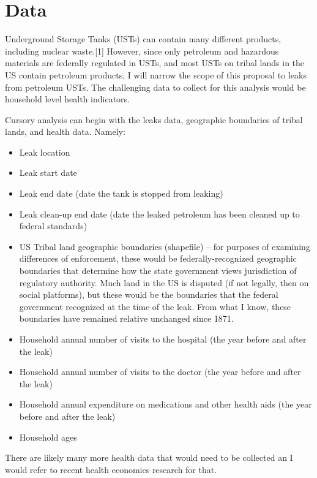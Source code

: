 \documentclass[12pt]{article}
\begin{document}
\section{Data}



Underground Storage Tanks (USTs) can contain many different products, including nuclear waste.[1] However, since only petroleum and hazardous materials are federally regulated in USTs, and most USTs on tribal lands in the US contain petroleum products, I will narrow the scope of this proposal to leaks from petroleum USTs. The challenging data to collect for this analysis would be household level health indicators.

Cursory analysis can begin with the leaks data, geographic boundaries of tribal lands, and health data. Namely:
\begin{itemize}
    \item Leak location
    \item Leak start date
    \item Leak end date (date the tank is stopped from leaking)
    \item Leak clean-up end date (date the leaked petroleum has been cleaned up to federal standards)
    \item US Tribal land geographic boundaries (shapefile) -- for purposes of examining differences of enforcement, these would be federally-recognized geographic boundaries that determine how the state government views jurisdiction of regulatory authority. Much land in the US is disputed (if not legally, then on social platforms), but these would be the boundaries that the federal government recognized at the time of the leak. From what I know, these boundaries have remained relative unchanged since 1871.
    \item Household annual number of visits to the hospital (the year before and after the leak)
    \item Household annual number of visits to the doctor (the year before and after the leak)
    \item Household annual expenditure on medications and other health aids (the year before and after the leak)
    \item Household ages
\end{itemize}

There are likely many more health data that would need to be collected an I would refer to recent health economics research for that.
\end{document}
